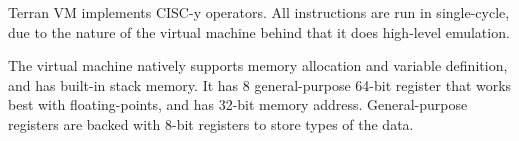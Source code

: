 Terran VM implements CISC-y operators. All instructions are run in single-cycle, due to the nature of the virtual machine behind that it does high-level emulation.

The virtual machine natively supports memory allocation and variable definition, and has built-in stack memory. It has 8 general-purpose 64-bit register that works best with floating-points, and has 32-bit memory address. General-purpose registers are backed with 8-bit registers to store types of the data.

